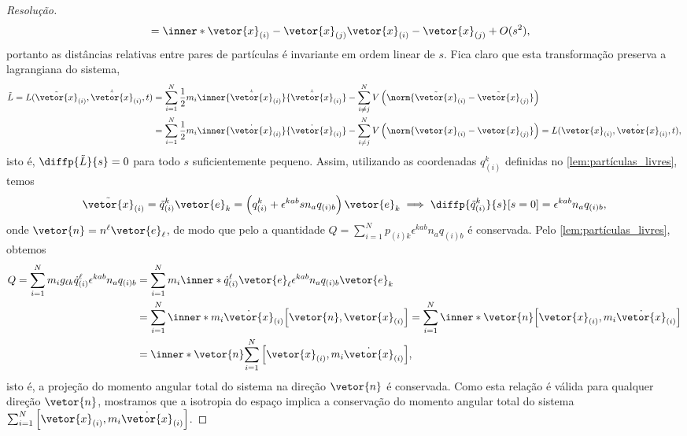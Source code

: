 \begin{proof}[Resolução]
\begin{align*}
                                                                                      &= \inner*{\vetor{x}_{(i)} - \vetor{x}_{(j)}}{\vetor{x}_{(i)} - \vetor{x}_{(j)}} + O(s^2),
    \end{align*}
    portanto as distâncias relativas entre pares de partículas é invariante em ordem linear de \(s\). Fica claro que esta transformação preserva a lagrangiana do sistema,
    \begin{align*}
        \tilde{L} = L(\tilde{\vetor{x}}_{(i)}, \dot{\tilde{\vetor{x}}}_{(i)}, t) &= \sum_{i = 1}^N \frac12 m_i \inner{\dot{\tilde{\vetor{x}}}_{(i)}}{\dot{\tilde{\vetor{x}}}_{(i)}} - \sum_{i\neq j}^{N} V\left(\norm{\tilde{\vetor{x}}_{(i)} - \tilde{\vetor{x}}_{(j)}}\right)\\
                                                                                 &= \sum_{i = 1}^N \frac12 m_i \inner{\dot{{\vetor{x}}}_{(i)}}{\dot{{\vetor{x}}}_{(i)}} - \sum_{i\neq j}^{N} V\left(\norm{{\vetor{x}}_{(i)} - {\vetor{x}}_{(j)}}\right) = L(\vetor{x}_{(i)}, \dot{\vetor{x}}_{(i)}, t),
    \end{align*}
    isto é, \(\diffp{\tilde{L}}{s} = 0\) para todo \(s\) suficientemente pequeno. Assim, utilizando as coordenadas \(q_{(i)}^k\) definidas no \cref{lem:partículas_livres}, temos
    \begin{equation*}
        \tilde{\vetor{x}}_{(i)} = \tilde{q}_{(i)}^k\vetor{e}_k = \left(q_{(i)}^k + \epsilon^{k ab} s n_a q_{(i)b}\right)\vetor{e}_k \implies \diffp{\tilde{q}_{(i)}^k}{s}[s=0] = \epsilon^{kab} n_a q_{(i)b},
    \end{equation*}
    onde \(\vetor{n} = n^\ell \vetor{e}_\ell\), de modo que pelo  a quantidade \(Q = \sum_{i = 1}^N p_{(i)k} \epsilon^{kab}n_a q_{(i)b}\) é conservada. Pelo \cref{lem:partículas_livres}, obtemos
    \begin{align*}
        Q = \sum_{i = 1}^N m_i g_{\ell k} \dot{q}_{(i)}^\ell \epsilon^{kab} n_aq_{(i)b} &= \sum_{i =1}^N m_i \inner*{\dot{q}_{(i)}^\ell\vetor{e}_\ell}{\epsilon^{kab}n_aq_{(i)b} \vetor{e}_k}\\
          &= \sum_{i = 1}^N \inner*{m_i\dot{\vetor{x}}_{(i)}}{\left[\vetor{n}, \vetor{x}_{(i)}\right]} = \sum_{i = 1}^N \inner*{\vetor{n}}{\left[\vetor{x}_{(i)}, m_i\dot{\vetor{x}}_{(i)}\right]}\\
          &= \inner*{\vetor{n}}{\sum_{i = 1}^N\left[\vetor{x}_{(i)}, m_i\dot{\vetor{x}}_{(i)}\right]},
    \end{align*}
    isto é, a projeção do momento angular total do sistema na direção \(\vetor{n}\) é conservada. Como esta relação é válida para qualquer direção \(\vetor{n}\), mostramos que a isotropia do espaço implica a conservação do momento angular total do sistema \(\sum_{i = 1}^N \left[\vetor{x}_{(i)}, m_i \dot{\vetor{x}}_{(i)}\right]\).
\end{proof}
